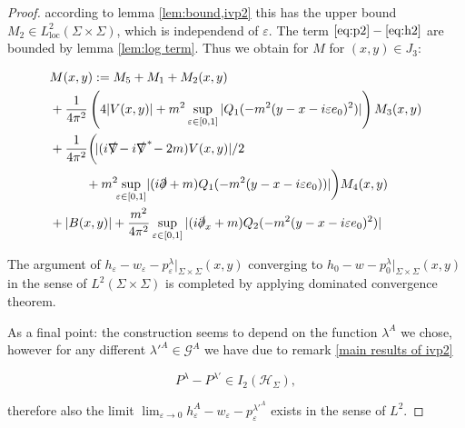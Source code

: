 \documentclass[b5paper,draft,openbib,12pt]{memoir}
\begin{document}
\begin{proof}
according to lemma \ref{lem:bound,ivp2} this has the 
upper bound 
\(M_2\in L^2_{\mathrm{loc}}(\Sigma\times\Sigma)\), which 
is independend of \(\varepsilon\). 
The term \(\eqref{eq:p2} -\eqref{eq:h2}\) are 
bounded by lemma \ref{lem:log term}.
Thus we obtain for \(M\) for \((x,y)\in J_3\):

\begin{align*}
&M(x,y):=M_5+M_1
+M_2(x,y)\\
&+\frac{1}{4\pi^2}\left(4 | V(x,y)| + m^2 \sup_{\varepsilon \in [0,1]}|Q_1(-m^2(y-x-i\varepsilon e_0)^2)|\right)M_3(x,y)\\
&+ \frac{1}{4\pi^2}\bigg(\!|(i\slashed{\nabla}\!-i\slashed{\nabla}^*\!-2m)V(x,y)|/2\\
&\hspace{1cm}+m^2\!\! \sup_{\varepsilon \in [0,1]}
  \!|(i\slashed{\partial}+m)Q_1(-m^2(y-x-i\varepsilon e_0))| \bigg)M_4(x,y)\\
&+|B(x,y)|+\frac{m^2}{4\pi^2}\sup_{\varepsilon\in[0,1]} |(i\slashed{\partial}_x+m)Q_2(-m^2(y-x-i\varepsilon e_0)^2)|
\end{align*}

The argument of \(h_\varepsilon-w_\varepsilon-p^\lambda_{\varepsilon}|_{\Sigma\times \Sigma}(x,y)\) 
converging to \(h_0-w-p^\lambda_{0}|_{\Sigma\times \Sigma}(x,y)\) in the sense of \(L^2(\Sigma\times\Sigma)\)
is completed by applying dominated convergence theorem. 

As a final point: the construction seems to depend on the function \(\lambda^A\) we chose, however for any different \({\lambda'}^A\in \mathcal{G}^A\) 
we have due to remark \ref{main results of ivp2}

\begin{equation}
P^{\lambda}-P^{\lambda'}\in I_2(\mathcal{H}_\Sigma ),
\end{equation}

therefore also the limit \(\lim_{\varepsilon\rightarrow 0} h_\varepsilon^A - w_\varepsilon - p_\varepsilon^{{\lambda'}^A}\) exists in the sense of \(L^2\).


\end{proof}
\end{document}
